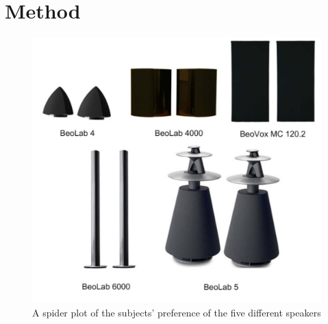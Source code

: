 \section*{Method}
\label{Method}


\begin{figure}
\centering
\includegraphics[width = \textwidth]{Figure/speakers.png}
\caption{A spider plot of the subjects' preference of the five different speakers}
\label{fig:speakers}
\end{figure}